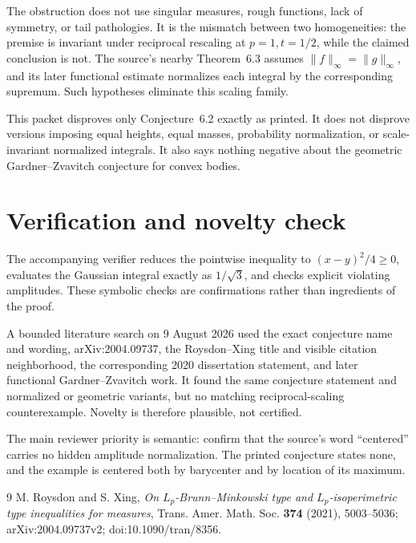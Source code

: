 \documentclass[11pt]{article}
\begin{document}
The obstruction does not use singular measures, rough functions, lack of symmetry, or tail pathologies.
It is the mismatch between two homogeneities: the premise is invariant under reciprocal rescaling at
$p=1,t=1/2$, while the claimed conclusion is not.  The source's nearby Theorem~6.3 assumes
$\lVert f\rVert_\infty=\lVert g\rVert_\infty$, and its later functional estimate normalizes each
integral by the corresponding supremum.  Such hypotheses eliminate this scaling family.

This packet disproves only Conjecture~6.2 exactly as printed.  It does not disprove versions imposing
equal heights, equal masses, probability normalization, or scale-invariant normalized integrals.  It
also says nothing negative about the geometric Gardner--Zvavitch conjecture for convex bodies.

\section{Verification and novelty check}

The accompanying verifier reduces the pointwise inequality to $(x-y)^2/4\geq0$, evaluates the
Gaussian integral exactly as $1/\sqrt3$, and checks explicit violating amplitudes.  These symbolic
checks are confirmations rather than ingredients of the proof.

A bounded literature search on 9 August 2026 used the exact conjecture name and wording,
arXiv:2004.09737, the Roysdon--Xing title and visible citation neighborhood, the corresponding 2020
dissertation statement, and later functional Gardner--Zvavitch work.  It found the same conjecture
statement and normalized or geometric variants, but no matching reciprocal-scaling counterexample.
Novelty is therefore plausible, not certified.

The main reviewer priority is semantic: confirm that the source's word ``centered'' carries no hidden
amplitude normalization.  The printed conjecture states none, and the example is centered both by
barycenter and by location of its maximum.

\begin{thebibliography}{9}
M. Roysdon and S. Xing,
\emph{On $L_p$-Brunn--Minkowski type and $L_p$-isoperimetric type inequalities for measures},
Trans. Amer. Math. Soc. \textbf{374} (2021), 5003--5036;
arXiv:2004.09737v2; doi:10.1090/tran/8356.
\end{thebibliography}
\end{document}
